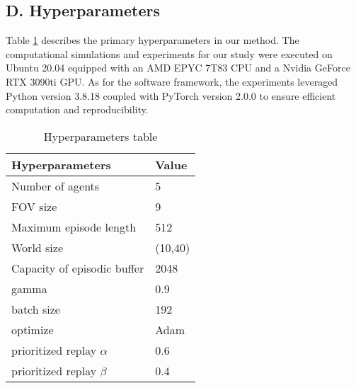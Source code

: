 \documentclass[conference]{IEEEtran}
\begin{document}
\subsection*{D. Hyperparameters}
Table \ref{hyperparameters} describes the primary hyperparameters in our method. The computational simulations and experiments for our study were executed on Ubuntu 20.04 equipped with an AMD EPYC 7T83 CPU and a Nvidia GeForce RTX 3090ti GPU. As for the software framework, the experiments leveraged Python version 3.8.18 coupled with PyTorch version 2.0.0 to ensure efficient computation and reproducibility.
\begin{table}[h]
\centering
\caption{Hyperparameters table}
\begin{tabular}{@{}ll@{}}
\toprule
\textbf{Hyperparameters} & \textbf{Value} \\ \midrule
Number of agents& 5\\
FOV size& 9\\
Maximum episode length& 512\\
World size& (10,40)\\
Capacity of episodic buffer& 2048\\
gamma & 0.9 \\
batch size& 192\\
optimize & Adam \\
prioritized replay $\alpha$& 0.6\\
prioritized replay $\beta$& 0.4\\ \bottomrule
\end{tabular}
\label{hyperparameters}
\end{table}
\end{document}
